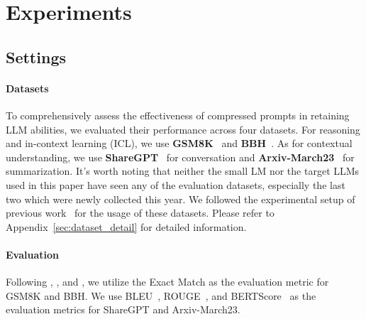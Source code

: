 \section{Experiments}

\subsection{Settings}
\paragraph{Datasets}
To comprehensively assess the effectiveness of compressed prompts in retaining LLM abilities, we evaluated their performance across four datasets.
For reasoning and in-context learning (ICL), we use \textbf{GSM8K}~\cite{cobbe2021training} and \textbf{BBH}~\cite{suzgun2022challenging}.
As for contextual understanding, we use \textbf{ShareGPT}~\cite{sharegpt} for conversation and \textbf{Arxiv-March23}~\cite{li2023unlocking} for summarization.
It's worth noting that neither the small LM nor the target LLMs used in this paper have seen any of the evaluation datasets, especially the last two which were newly collected this year.
We followed the experimental setup of previous work~\cite{fu2023chain,li2023unlocking} for the usage of these datasets.
Please refer to Appendix~\ref{sec:dataset_detail} for detailed information.


\paragraph{Evaluation}
Following \citet{cobbe2021training}, \citet{fu2023chain}, and \citet{li2023unlocking}, we utilize the Exact Match as the evaluation metric for GSM8K and BBH.
We use BLEU~\cite{papineni2002bleu}, ROUGE~\cite{lin2004rouge}, and BERTScore~\cite{zhang2020BERTScore} as the evaluation metrics for ShareGPT and Arxiv-March23.

